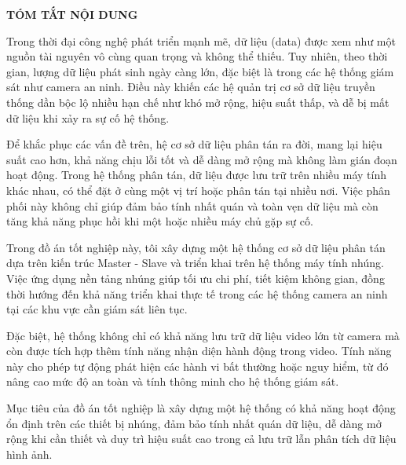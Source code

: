 \documentclass[../main.tex]{subfiles}
\begin{document}
\begin{center}
    \Large{\textbf{TÓM TẮT NỘI DUNG}}\\
\end{center}
\vspace{1cm}
Trong thời đại công nghệ phát triển mạnh mẽ, dữ liệu (data) được xem như một nguồn tài nguyên vô cùng quan trọng và không thể thiếu. Tuy nhiên, theo thời gian, lượng dữ liệu phát sinh ngày càng lớn, đặc biệt là trong các hệ thống giám sát như camera an ninh. Điều này khiến các hệ quản trị cơ sở dữ liệu truyền thống dần bộc lộ nhiều hạn chế như khó mở rộng, hiệu suất thấp, và dễ bị mất dữ liệu khi xảy ra sự cố hệ thống.

Để khắc phục các vấn đề trên, hệ cơ sở dữ liệu phân tán ra đời, mang lại hiệu suất cao hơn, khả năng chịu lỗi tốt và dễ dàng mở rộng mà không làm gián đoạn hoạt động. Trong hệ thống phân tán, dữ liệu được lưu trữ trên nhiều máy tính khác nhau, có thể đặt ở cùng một vị trí hoặc phân tán tại nhiều nơi. Việc phân phối này không chỉ giúp đảm bảo tính nhất quán và toàn vẹn dữ liệu mà còn tăng khả năng phục hồi khi một hoặc nhiều máy chủ gặp sự cố.

Trong đồ án tốt nghiệp này, tôi xây dựng một hệ thống cơ sở dữ liệu phân tán dựa trên kiến trúc Master - Slave và triển khai trên hệ thống máy tính nhúng. Việc ứng dụng nền tảng nhúng giúp tối ưu chi phí, tiết kiệm không gian, đồng thời hướng đến khả năng triển khai thực tế trong các hệ thống camera an ninh tại các khu vực cần giám sát liên tục.

Đặc biệt, hệ thống không chỉ có khả năng lưu trữ dữ liệu video lớn từ camera mà còn được tích hợp thêm tính năng nhận diện hành động trong video. Tính năng này cho phép tự động phát hiện các hành vi bất thường hoặc nguy hiểm, từ đó nâng cao mức độ an toàn và tính thông minh cho hệ thống giám sát.

Mục tiêu của đồ án tốt nghiệp là xây dựng một hệ thống có khả năng hoạt động ổn định trên các thiết bị nhúng, đảm bảo tính nhất quán dữ liệu, dễ dàng mở rộng khi cần thiết và duy trì hiệu suất cao trong cả lưu trữ lẫn phân tích dữ liệu hình ảnh.
\end{document}
